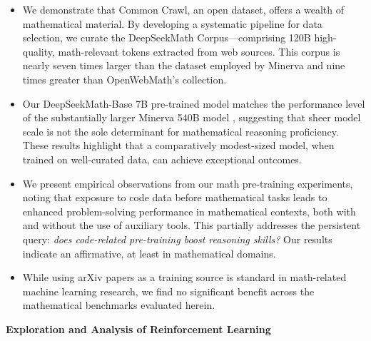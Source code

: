 \begin{itemize}[topsep=0pt]
    \item We demonstrate that Common Crawl, an open dataset, offers a wealth of mathematical material. By developing a systematic pipeline for data selection, we curate the DeepSeekMath Corpus—comprising 120B high-quality, math-relevant tokens extracted from web sources. This corpus is nearly seven times larger than the dataset employed by Minerva \citep{minerva} and nine times greater than OpenWebMath's \citep{openwebmath} collection.
    
    \item Our DeepSeekMath-Base 7B pre-trained model matches the performance level of the substantially larger Minerva 540B model \citep{minerva}, suggesting that sheer model scale is not the sole determinant for mathematical reasoning proficiency. These results highlight that a comparatively modest-sized model, when trained on well-curated data, can achieve exceptional outcomes.
    
    \item We present empirical observations from our math pre-training experiments, noting that exposure to code data before mathematical tasks leads to enhanced problem-solving performance in mathematical contexts, both with and without the use of auxiliary tools. This partially addresses the persistent query: \textit{does code-related pre-training boost reasoning skills?} Our results indicate an affirmative, at least in mathematical domains.
    
    \item While using arXiv papers as a training source is standard in math-related machine learning research, we find no significant benefit across the mathematical benchmarks evaluated herein.
\end{itemize}

\textbf{Exploration and Analysis of Reinforcement Learning}

